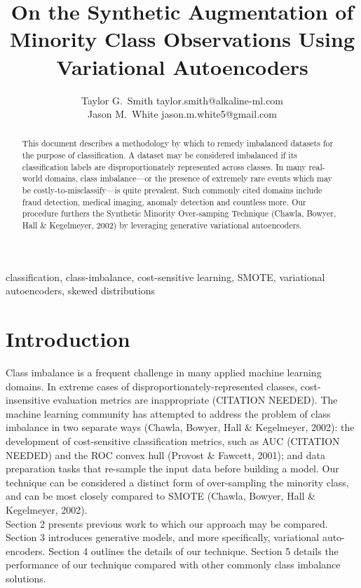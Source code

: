 \documentclass[twoside,11pt]{article}
\begin{document}
\title{On the Synthetic Augmentation of Minority Class Observations Using Variational Autoencoders}

\author{\name Taylor G.\ Smith \email taylor.smith@alkaline-ml.com \\
       \AND
       \name Jason M.\ White \email jason.m.white5@gmail.com}


\maketitle

\begin{abstract}%
This document describes a methodology by which to remedy imbalanced datasets for the purpose of classification. A dataset may be considered imbalanced if its classification labels are disproportionately represented across classes. In many real-world domains, class imbalance---or the presence of extremely rare events which may be costly-to-misclassify---is quite prevalent. Such commonly cited domains include fraud detection, medical imaging, anomaly detection and countless more.  Our procedure furthers the Synthetic Minority Over-samping Technique (Chawla, Bowyer, Hall \& Kegelmeyer, 2002) by leveraging generative variational autoencoders.
\end{abstract}

\begin{keywords}
  classification, class-imbalance, cost-sensitive learning, SMOTE, variational autoencoders, skewed distributions
\end{keywords}

\section{Introduction}

Class imbalance is a frequent challenge in many applied machine learning domains. In extreme cases of disproportionately-represented classes, cost-insensitive evaluation metrics are inappropriate (CITATION NEEDED). The machine learning community has attempted to address the problem of class imbalance in two separate ways (Chawla, Bowyer, Hall \& Kegelmeyer, 2002): the development of cost-sensitive classification metrics, such as AUC (CITATION NEEDED) and the ROC convex hull (Provost \& Fawcett, 2001); and data preparation tasks that re-sample the input data before building a model. Our technique can be considered a distinct form of over-sampling the minority class, and can be most closely compared to SMOTE (Chawla, Bowyer, Hall \& Kegelmeyer, 2002).\\
        Section 2 presents previous work to which our approach may be compared. Section 3 introduces generative models, and more specifically, variational auto-encoders. Section 4 outlines the details of our technique. Section 5 details the performance of our technique compared with other commonly class imbalance solutions. \\
\end{document}
